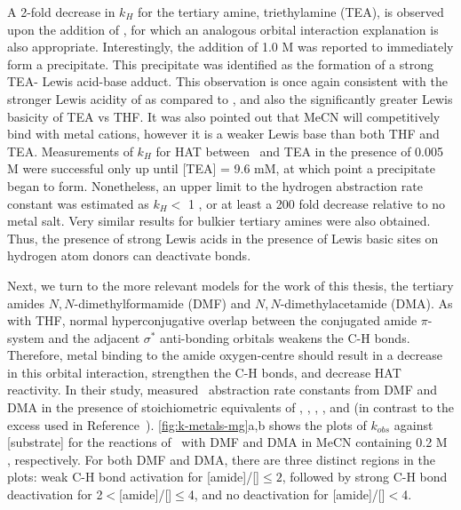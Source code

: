 A 2-fold decrease in $k_H$ for the tertiary amine, triethylamine (TEA), is
observed upon the addition of , for which an analogous orbital
interaction explanation is also appropriate. Interestingly, the addition of 1.0
M  was reported to immediately form a precipitate. This
precipitate was identified as the formation of a strong TEA- Lewis
acid-base adduct. This observation is once again consistent with the stronger
Lewis acidity of  as compared to , and also the
significantly greater Lewis basicity of TEA vs THF.\cite{Salamone2013a,
Reichardt2010} It was also pointed out that MeCN will competitively bind with
metal cations, however it is a weaker Lewis base than both THF and TEA.
Measurements of $k_H$ for HAT between \cumo\ and TEA in the presence of 0.005 M
 were successful only up until [TEA] = 9.6 mM, at which point a
precipitate began to form. Nonetheless, an upper limit to the hydrogen
abstraction rate constant was estimated as $k_H <$ 1 \Ms, or at least a
200 fold decrease relative to no metal salt. Very similar results for bulkier
tertiary amines were also obtained. Thus, the presence of strong Lewis acids in
the presence of Lewis basic sites on hydrogen atom donors can deactivate
 bonds.

Next, we turn to the more relevant models for the work of this thesis, the
tertiary amides $N,N$-dimethylformamide (DMF) and $N,N$-dimethylacetamide
(DMA). As with THF, normal hyperconjugative overlap between the conjugated
amide $\pi$-system and the adjacent  $\sigma^*$ anti-bonding orbitals
weakens the C-H bonds. Therefore, metal binding to the amide oxygen-centre
should result in a decrease in this orbital interaction, strengthen the C-H
bonds, and decrease HAT reactivity. In their study, \citet{Salamone2015metals}
measured \cumo\ abstraction rate constants from DMF and DMA in the presence of
stoichiometric equivalents of , , ,
, and  (in contrast to the excess used in
Reference~). \ref{fig:k-metals-mg}a,b shows the plots of
$k_{obs}$ against [substrate] for the reactions of \cumo\ with DMF and DMA in
MeCN containing 0.2 M , respectively. For both DMF and DMA, there
are three distinct regions in the plots: weak C-H bond activation for
[amide]/[]$\leq 2$, followed by strong C-H bond deactivation for
2$<$[amide]/[]$\leq$4, and no deactivation for
[amide]/[]$<$4.

